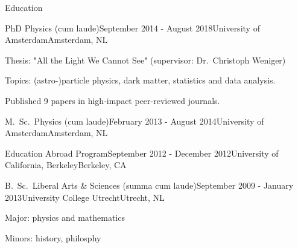 \documentclass{resume} %
\begin{document}

\begin{rSection}{Education}

\begin{rSubsection}{PhD Physics (cum laude)}{September 2014 - August 2018}{University of Amsterdam}{Amsterdam, NL}
\vspace{-1.5em}
\item Thesis: "All the Light We Cannot See" (supervisor: Dr.~Christoph Weniger)
\item Topics: (astro-)particle physics, dark matter, statistics and data analysis.
\item Published 9 papers in high-impact peer-reviewed journals.
\end{rSubsection}

\begin{rSubsection}{M.~Sc.~Physics (cum laude)}{February 2013 - August 2014}{University of Amsterdam}{Amsterdam, NL}
\vspace{-1.5em}
\end{rSubsection}

\begin{rSubsection}{Education Abroad Program}{September 2012 - December 2012}{University of California, Berkeley}{Berkeley, CA}
\vspace{-1.5em}
\end{rSubsection}

\begin{rSubsection}{B.~Sc.~Liberal Arts \& Sciences (summa cum laude)}{September 2009 - January 2013}{University College Utrecht}{Utrecht, NL}
\vspace{-1.5em}
 \item Major: physics and mathematics
 \item Minors: history, philosphy
\end{rSubsection}
\end{rSection}

\end{document}
